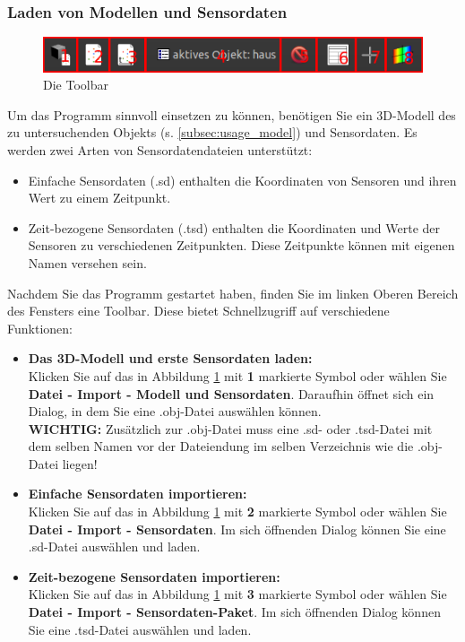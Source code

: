 \documentclass[10pt,a5paper,twoside,titlepage]{scrartcl}
\begin{document}
	\subsubsection{Laden von Modellen und Sensordaten}
	\label{subsec:toolbar_and_loading}
	\begin{figure}
	\centering
	\includegraphics[trim=0cm 0cm 0cm 0cm,clip=true,scale=.5]{Simple_Analyzer_toolbar.png}
	\caption{Die Toolbar}
	\label{fig:sa_toolbar}
	\end{figure}
	Um das Programm sinnvoll einsetzen zu können, benötigen Sie ein 3D-Modell des zu untersuchenden Objekts (s. \ref{subsec:usage_model}) und Sensordaten. Es werden zwei Arten von Sensordatendateien unterstützt:
	\begin{itemize}
	\item Einfache Sensordaten (.sd) enthalten die Koordinaten von Sensoren und ihren Wert zu einem Zeitpunkt.
	\item Zeit-bezogene Sensordaten (.tsd) enthalten die Koordinaten und Werte der Sensoren zu verschiedenen Zeitpunkten. Diese Zeitpunkte können mit eigenen Namen versehen sein.
	\end{itemize}
	Nachdem Sie das Programm gestartet haben, finden Sie im linken Oberen Bereich des Fensters eine Toolbar. Diese bietet Schnellzugriff auf verschiedene Funktionen:
	\begin{itemize}
	\item \textbf{Das 3D-Modell und erste Sensordaten laden:} \\
	Klicken Sie auf das in Abbildung \ref{fig:sa_toolbar} mit \textbf{1} markierte Symbol oder wählen Sie \textbf{Datei - Import - Modell und Sensordaten}. Daraufhin öffnet sich ein Dialog, in dem Sie eine .obj-Datei auswählen können. \\\textbf{WICHTIG:} Zusätzlich zur .obj-Datei muss eine .sd- oder .tsd-Datei mit dem selben Namen vor der Dateiendung im selben Verzeichnis wie die .obj-Datei liegen!
	\item \textbf{Einfache Sensordaten importieren:}\\
	Klicken Sie auf das in Abbildung \ref{fig:sa_toolbar} mit \textbf{2} markierte Symbol oder wählen Sie \textbf{Datei - Import - Sensordaten}. Im sich öffnenden Dialog können Sie eine .sd-Datei auswählen und laden.
	\item \textbf{Zeit-bezogene Sensordaten importieren:}\\
	Klicken Sie auf das in Abbildung \ref{fig:sa_toolbar} mit \textbf{3} markierte Symbol oder wählen Sie \textbf{Datei - Import - Sensordaten-Paket}. Im sich öffnenden Dialog können Sie eine .tsd-Datei auswählen und laden.
	\end{itemize}
\end{document}
